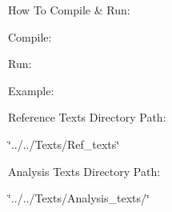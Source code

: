 How To Compile \& Run\+:

Compile\+: 
\begin{DoxyCode}{0}

\end{DoxyCode}
 Run\+: 
\begin{DoxyCode}{0}

\end{DoxyCode}

\begin{DoxyItemize}
\item Example\+: 
\begin{DoxyCode}{0}

\end{DoxyCode}

\end{DoxyItemize}

Reference Texts Directory Path\+:


\begin{DoxyItemize}
\item \char`\"{}../../\+Texts/\+Ref\+\_\+texts\char`\"{}
\end{DoxyItemize}

Analysis Texts Directory Path\+:


\begin{DoxyItemize}
\item \char`\"{}../../\+Texts/\+Analysis\+\_\+texts/\char`\"{} 
\end{DoxyItemize}